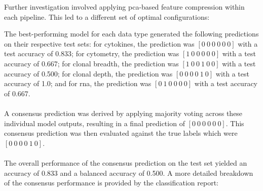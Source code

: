 \documentclass[12pt,a4paper]{report}
\begin{document}
\noindent
Further investigation involved applying \gls{pca}-based feature compression within each pipeline. This led to a different set of optimal configurations:
\begin{table}[H]
    \centering
    \hspace*{-1cm}
    \caption[Optimal Modeling Configurations Compressed Features]{Optimal Modeling Configurations for Compressed Features}
    \label{tab:optimal_configs_compressed}
\end{table}
\noindent
The best-performing model for each data type generated the following predictions on their respective test sets: for cytokines, the prediction was $[0\ 0\ 0\ 0\ 0\ 0]$ with a test accuracy of 0.833; for cytometry, the prediction was $[1\ 0\ 0\ 0\ 0\ 0]$ with a test accuracy of 0.667; for clonal breadth, the prediction was $[1\ 0\ 0\ 1\ 0\ 0]$ with a test accuracy of 0.500; for clonal depth, the prediction was $[0\ 0\ 0\ 0\ 1\ 0]$ with a test accuracy of 1.0; and for \acrshort{rna}, the prediction was $[0\ 1\ 0\ 0\ 0\ 0]$ with a test accuracy of 0.667.\\
\\
A consensus prediction was derived by applying majority voting across these individual model outputs, resulting in a final prediction of $[0\ 0\ 0\ 0\ 0\ 0]$. This consensus prediction was then evaluated against the true labels which were $[0\ 0\ 0\ 0\ 1\ 0]$.\\
\\
The overall performance of the consensus prediction on the test set yielded an accuracy of 0.833 and a balanced accuracy of 0.500. A more detailed breakdown of the consensus performance is provided by the classification report:
\end{document}
